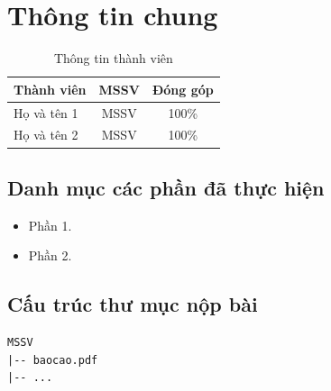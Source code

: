 \section*{Thông tin chung}

\begin{table}[H]
\centering
\caption*{Thông tin thành viên}
\renewcommand{\arraystretch}{1.25}
\begin{tabular}{l c c}
\toprule
\textbf{Thành viên} & \textbf{MSSV} & \textbf{Đóng góp} \\
\midrule
Họ và tên 1 & MSSV & 100\% \\
Họ và tên 2 & MSSV & 100\% \\
\bottomrule
\end{tabular}
\end{table}

\subsection*{Danh mục các phần đã thực hiện}
\begin{itemize}
    \item Phần 1.
    \item Phần 2.
\end{itemize}

\subsection*{Cấu trúc thư mục nộp bài}
\begin{verbatim}
MSSV
|-- baocao.pdf
|-- ...
\end{verbatim}

